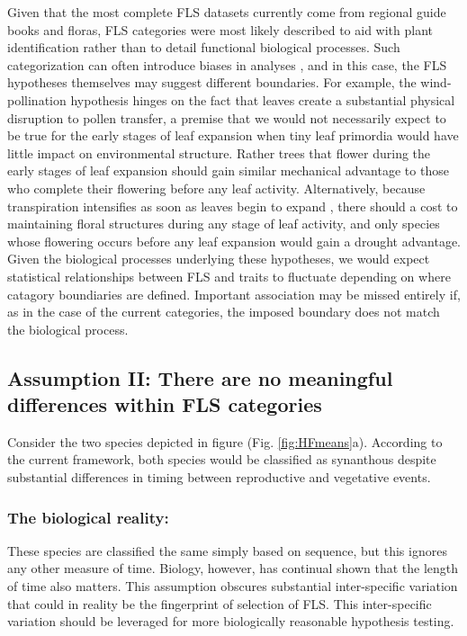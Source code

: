 \documentclass{article}
\begin{document}
Given that the most complete FLS datasets currently come from regional guide books and floras, FLS categories were most likely described to aid with plant identification rather than to detail functional biological processes. Such categorization can often introduce biases in analyses \citep{}, and in this case, the FLS hypotheses themselves may suggest different boundaries. For example, the wind-pollination hypothesis hinges on the fact that leaves create a substantial physical disruption to pollen transfer, a premise that we would not necessarily expect to be true for the early stages of leaf expansion when tiny leaf primordia would have little impact on environmental structure. Rather trees that flower during the early stages of leaf expansion should gain similar mechanical advantage to those who complete their flowering before any leaf activity. Alternatively, because transpiration intensifies as soon as leaves begin to expand \citep{Breda1996,Wang2018}, there should a cost to maintaining floral structures during any stage of leaf activity, and only species whose flowering occurs before any leaf expansion would gain a drought advantage. Given the biological processes underlying these hypotheses, we would expect statistical relationships between FLS and traits to fluctuate depending on where catagory boundiaries are defined. Important association may be missed entirely if, as in the case of the current categories, the imposed boundary does not match the biological process.

\subsection*{Assumption II: There are no meaningful differences within FLS categories}
 Consider the two species depicted in figure (Fig. \ref{fig:HFmeans}a). According to the current framework, both species would be classified as synanthous despite substantial differences in timing between reproductive and vegetative events.
\subsubsection*{The biological reality:}
These species are classified the same simply based on sequence, but this ignores any other measure of time. Biology, however, has continual shown that the length of time also matters\citep{}. This assumption obscures substantial inter-specific variation that could in reality be the fingerprint of selection of FLS. This inter-specific variation should be leveraged for more biologically reasonable hypothesis testing.
\end{document}

